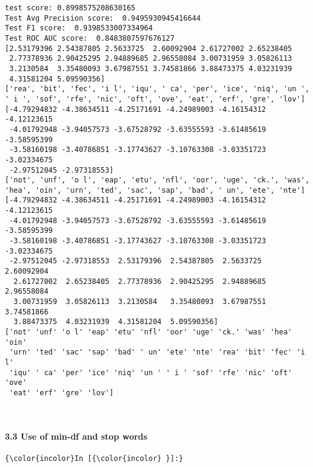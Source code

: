\documentclass[11pt]{article}
\begin{document}
    \begin{Verbatim}[commandchars=\\\{\}]
test score: 0.8998575208630165
Test Avg Precision score:  0.9495930945416644
Test F1 score:  0.9398533007334964
Test ROC AUC score:  0.8483807597676127
[2.53179396 2.54387805 2.5633725  2.60092904 2.61727002 2.65238405
 2.77378936 2.90425295 2.94889685 2.96558084 3.00731959 3.05826113
 3.2130584  3.35480093 3.67987551 3.74581866 3.88473375 4.03231939
 4.31581204 5.09590356]
['rea', 'bit', 'fec', 'i l', 'iqu', ' ca', 'per', 'ice', 'niq', 'un ', ' i ', 'sof', 'rfe', 'nic', 'oft', 'ove', 'eat', 'erf', 'gre', 'lov']
[-4.79294832 -4.38634511 -4.25171691 -4.24989003 -4.16154312 -4.12123615
 -4.01792948 -3.94057573 -3.67528792 -3.63555593 -3.61485619 -3.58595399
 -3.58160198 -3.40786851 -3.17743627 -3.10763308 -3.03351723 -3.02334675
 -2.97512045 -2.97318553]
['not', 'unf', 'o l', 'eap', 'etu', 'nfl', 'oor', 'uge', 'ck.', 'was', 'hea', 'oin', 'urn', 'ted', 'sac', 'sap', 'bad', ' un', 'ete', 'nte']
[-4.79294832 -4.38634511 -4.25171691 -4.24989003 -4.16154312 -4.12123615
 -4.01792948 -3.94057573 -3.67528792 -3.63555593 -3.61485619 -3.58595399
 -3.58160198 -3.40786851 -3.17743627 -3.10763308 -3.03351723 -3.02334675
 -2.97512045 -2.97318553  2.53179396  2.54387805  2.5633725   2.60092904
  2.61727002  2.65238405  2.77378936  2.90425295  2.94889685  2.96558084
  3.00731959  3.05826113  3.2130584   3.35480093  3.67987551  3.74581866
  3.88473375  4.03231939  4.31581204  5.09590356]
['not' 'unf' 'o l' 'eap' 'etu' 'nfl' 'oor' 'uge' 'ck.' 'was' 'hea' 'oin'
 'urn' 'ted' 'sac' 'sap' 'bad' ' un' 'ete' 'nte' 'rea' 'bit' 'fec' 'i l'
 'iqu' ' ca' 'per' 'ice' 'niq' 'un ' ' i ' 'sof' 'rfe' 'nic' 'oft' 'ove'
 'eat' 'erf' 'gre' 'lov']

    \end{Verbatim}

    \begin{center}
    \end{center}
    { \hspace*{\fill} \\}
    
    \paragraph{3.3 Use of min-df and stop
words}\label{use-of-min-df-and-stop-words}

    \begin{Verbatim}[commandchars=\\\{\}]
{\color{incolor}In [{\color{incolor} }]:} 
\end{Verbatim}
\end{document}
